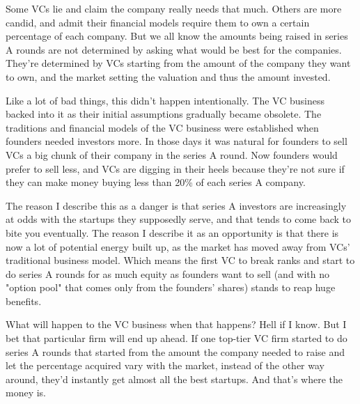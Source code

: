 Some VCs
                  lie and claim the company really needs that much. Others are
                  more candid, and admit their financial models require them to
                  own a certain percentage of each company. But we all know the
                  amounts being raised in series A rounds are not determined by
                  asking what would be best for the companies. They're
                  determined by VCs starting from the amount of the company they
                  want to own, and the market setting the valuation and thus the
                  amount invested.

Like a lot of bad things, this
                  didn't happen intentionally. The VC business backed into it as
                  their initial assumptions gradually became obsolete. The
                  traditions and financial models of the VC business were
                  established when founders needed investors more. In those days
                  it was natural for founders to sell VCs a big chunk of their
                  company in the series A round. Now founders would prefer to
                  sell less, and VCs are digging in their heels because they're
                  not sure if they can make money buying less than 20\% of each
                  series A company.

The reason I describe this as a
                  danger is that series A investors are increasingly at odds
                  with the startups they supposedly serve, and that tends to
                  come back to bite you eventually. The reason I describe it as
                  an opportunity is that there is now a lot of potential energy
                  built up, as the market has moved away from VCs' traditional
                  business model. Which means the first VC to break ranks and
                  start to do series A rounds for as much equity as founders
                  want to sell (and with no "option pool" that comes only from
                  the founders' shares) stands to reap huge benefits.

What
                  will happen to the VC business when that happens? Hell if I
                  know. But I bet that particular firm will end up ahead. If one
                  top-tier VC firm started to do series A rounds that started
                  from the amount the company needed to raise and let the
                  percentage acquired vary with the market, instead of the other
                  way around, they'd instantly get almost all the best startups.
                  And that's where the money is.

